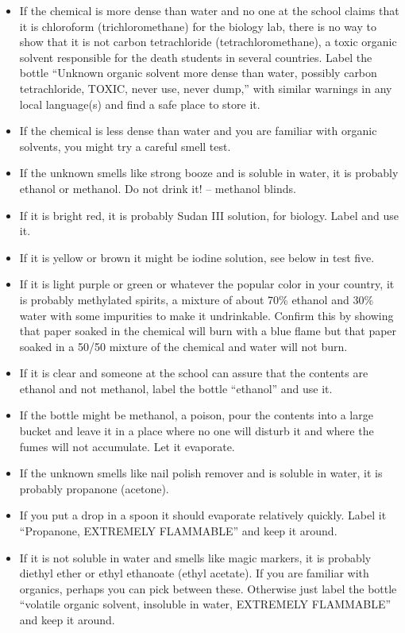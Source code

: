 \begin{itemize}
\item If the chemical is more dense than water 
and no one at the school claims that it is chloroform 
(trichloromethane) for the biology lab, 
there is no way to show that it is not carbon tetrachloride 
(tetrachloromethane), 
a toxic organic solvent responsible 
for the death students in several countries. 
Label the bottle ``Unknown organic solvent more dense than water, 
possibly carbon tetrachloride, 
TOXIC, 
never use, 
never dump,'' with similar warnings in any local language(s) 
and find a safe place to store it.

\item If the chemical is less dense than water 
and you are familiar with organic solvents, 
you might try a careful smell test.

\item If the unknown smells like strong booze and is soluble in water, 
it is probably ethanol or methanol. 
Do not drink it! -- methanol blinds. 
\item If it is bright red, 
it is probably Sudan III solution, 
for biology. 
Label and use it. 
\item If it is yellow or brown it might be iodine solution, 
see below in test five. 
\item If it is light purple or green or whatever 
the popular color in your country, 
it is probably methylated spirits, 
a mixture of about 70\% ethanol and 30\% water
with some impurities to make it undrinkable. 
Confirm this by showing that paper soaked in the chemical 
will burn with a blue flame but that paper soaked in a 50/50 
mixture of the chemical and water will not burn. 
\item If it is clear and someone at the school can assure 
that the contents are ethanol and not methanol, 
label the bottle ``ethanol'' and use it. 
\item If the bottle might be methanol, 
a poison, 
pour the contents into a large bucket 
and leave it in a place where no one will disturb it 
and where the fumes will not accumulate. 
Let it evaporate.

\item If the unknown smells like nail polish remover 
and is soluble in water, 
it is probably propanone (acetone). 
\item If you put a drop in a spoon it should evaporate relatively quickly. 
Label it ``Propanone, 
EXTREMELY FLAMMABLE'' and keep it around. 
\item If it is not soluble in water and smells like magic markers, 
it is probably diethyl ether or ethyl ethanoate (ethyl acetate). 
If you are familiar with organics, 
perhaps you can pick between these. 
Otherwise just label the bottle ``volatile organic solvent, 
insoluble in water, 
EXTREMELY FLAMMABLE'' and keep it around.


\end{itemize}
